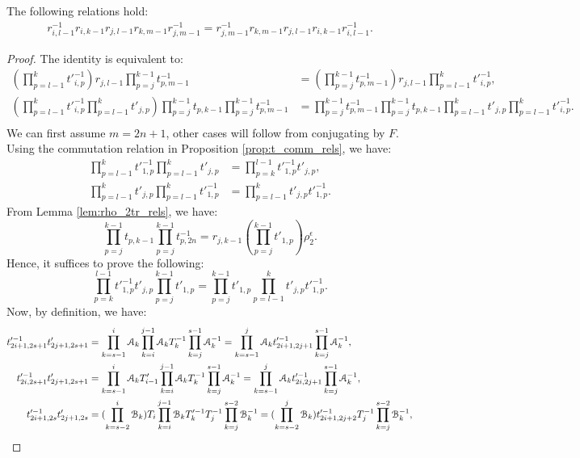 \documentclass{amsart}
\begin{document}
\begin{prop}\label{prop:r_pentagon}
 The following relations hold:
 \begin{align}
 r^{-1}_{i,l-1}r_{i,k-1}r_{j,l-1}r_{k,m-1}r^{-1}_{j,m-1}=r^{-1}_{j,m-1}r_{k,m-1}r_{j,l-1}r_{i,k-1}r^{-1}_{i,l-1}.
 \end{align}
\end{prop}
\begin{proof}
The identity is equivalent to:
\[
\begin{aligned}
(\prod^{k}_{p=l-1}t'^{-1}_{i,p})r_{j,l-1}\prod^{k-1}_{p=j}t^{-1}_{p,m-1}&=(\prod^{k-1}_{p=j}t^{-1}_{p,m-1})r_{j,l-1}\prod^{k}_{p=l-1}t'^{-1}_{i,p},\\   
(\prod^{k}_{p=l-1}t'^{-1}_{i,p}\prod^{k}_{p=l-1}t'_{j,p})\prod^{k-1}_{p=j}t_{p,k-1}\prod^{k-1}_{p=j}t^{-1}_{p,m-1}&=\prod^{k-1}_{p=j}t^{-1}_{p,m-1}\prod^{k-1}_{p=j}t_{p,k-1}\prod^{k}_{p=l-1}t'_{j,p}\prod^{k}_{p=l-1}t'^{-1}_{i,p}.\\
\end{aligned}
\]
We can first assume $m=2n+1$, other cases will follow from conjugating by $F$. Using the commutation relation in Proposition \ref{prop:t_comm_rels}, we have: 
\[
\begin{aligned}
\prod^{k}_{p=l-1}t'^{-1}_{1,p}\prod^{k}_{p=l-1}t'_{j,p}&=\prod^{l-1}_{p=k}t'^{-1}_{1,p}t'_{j,p},\\
\prod^{k}_{p=l-1}t'_{j,p}\prod^{k}_{p=l-1}t'^{-1}_{1,p}&=\prod^{k}_{p=l-1}t'_{j,p}t'^{-1}_{1,p}.   
\end{aligned} 
\] 
From Lemma \ref{lem:rho_2tr_rels}, we have: 
\[
\prod^{k-1}_{p=j}t_{p,k-1}\prod^{k-1}_{p=j}t^{-1}_{p,2n}=r_{j,k-1}(\prod^{k-1}_{p=j}t'_{1,p})\rho_2^{\epsilon}.
\]
Hence, it suffices to prove the following:
\[
\prod^{l-1}_{p=k}t'^{-1}_{1,p}t'_{j,p}\prod^{k-1}_{p=j}t'_{1,p}=\prod^{k-1}_{p=j}t'_{1,p}\prod^{k}_{p=l-1}t'_{j,p}t'^{-1}_{1,p}.
\]
Now, by definition, we have:
\iffalse
\[
\begin{aligned}
t'^{-1}_{2i+1,2s+1}t'_{2j+1,2s+1}&=\prod^{i}_{k=s-1}\AA_k\prod^{j-1}_{k=i}\AA_kT^{-1}_k\prod^{s-1}_{k=j}\AA^{-1}_k=\prod^{j}_{k=s-1}\AA_kt'^{-1}_{2i+1,2j+1}\prod^{s-1}_{k=j}\AA^{-1}_k,\\ 
t'^{-1}_{2i,2s+1}t'_{2j+1,2s+1}&=\prod^{i}_{k=s-1}\AA_kT'_{i-1}\prod^{j-1}_{k=i}\AA_kT^{-1}_k\prod^{s-1}_{k=j}\AA^{-1}_k=\prod^{j}_{k=s-1}\AA_kt'^{-1}_{2i,2j+1}\prod^{s-1}_{k=j}\AA^{-1}_k,\\ t'^{-1}_{2i+1,2s}t'_{2j+1,2s}&=(\prod^{i}_{k=s-2}\BB_k)T_i\prod^{j-1}_{k=i}\BB_kT'^{-1}_kT^{-1}_j\prod^{s-2}_{k=j}\BB^{-1}_k=(\prod^{j}_{k=s-2}\BB_k)t'^{-1}_{2i+1,2j+2}T^{-1}_j\prod^{s-2}_{k=j}\BB^{-1}_k,\\

\end{aligned}\]
\end{proof}
\end{document}

